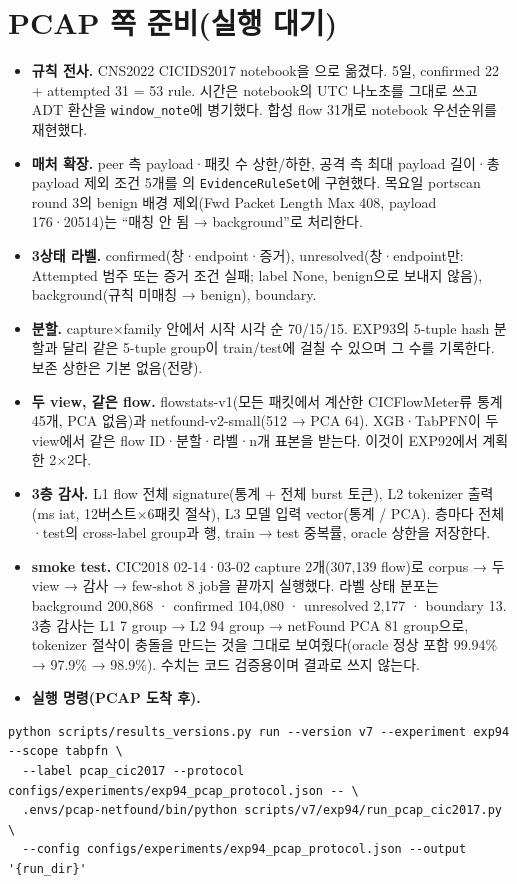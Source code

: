 \section{PCAP 쪽 준비(실행 대기)}
\begin{itemize}
\item \textbf{규칙 전사.} CNS2022 CICIDS2017 notebook을 으로 옮겼다. 5일, confirmed 22 + attempted 31 = 53 rule. 시간은 notebook의 UTC 나노초를 그대로 쓰고 ADT 환산을 \texttt{window\_note}에 병기했다. 합성 flow 31개로 notebook 우선순위를 재현했다.
\item \textbf{매처 확장.} peer 측 payload·패킷 수 상한/하한, 공격 측 최대 payload 길이·총 payload 제외 조건 5개를 의 \texttt{EvidenceRuleSet}에 구현했다. 목요일 portscan round 3의 benign 배경 제외(Fwd Packet Length Max 408, payload 176·20514)는 ``매칭 안 됨 → background''로 처리한다.
\item \textbf{3상태 라벨.} confirmed(창·endpoint·증거), unresolved(창·endpoint만: Attempted 범주 또는 증거 조건 실패; label None, benign으로 보내지 않음), background(규칙 미매칭 → benign), boundary.
\item \textbf{분할.} capture$\times$family 안에서 시작 시각 순 70/15/15. EXP93의 5-tuple hash 분할과 달리 같은 5-tuple group이 train/test에 걸칠 수 있으며 그 수를 기록한다. 보존 상한은 기본 없음(전량).
\item \textbf{두 view, 같은 flow.} flowstats-v1(모든 패킷에서 계산한 CICFlowMeter류 통계 45개, PCA 없음)과 netfound-v2-small(512 → PCA 64). XGB·TabPFN이 두 view에서 같은 flow ID·분할·라벨·n개 표본을 받는다. 이것이 EXP92에서 계획한 2$\times$2다.
\item \textbf{3층 감사.} L1 flow 전체 signature(통계 + 전체 burst 토큰), L2 tokenizer 출력(ms iat, 12버스트$\times$6패킷 절삭), L3 모델 입력 vector(통계 / PCA). 층마다 전체·test의 cross-label group과 행, train$\to$test 중복률, oracle 상한을 저장한다.
\item \textbf{smoke test.} CIC2018 02-14·03-02 capture 2개(307,139 flow)로 corpus → 두 view → 감사 → few-shot 8 job을 끝까지 실행했다. 라벨 상태 분포는 background 200,868 · confirmed 104,080 · unresolved 2,177 · boundary 13. 3층 감사는 L1 7 group → L2 94 group → netFound PCA 81 group으로, tokenizer 절삭이 충돌을 만드는 것을 그대로 보여줬다(oracle 정상 포함 99.94\% → 97.9\% → 98.9\%). 수치는 코드 검증용이며 결과로 쓰지 않는다.
\item \textbf{실행 명령(PCAP 도착 후).}
\end{itemize}
\begin{Verbatim}[fontsize=\small,breaklines=true]
python scripts/results_versions.py run --version v7 --experiment exp94 --scope tabpfn \
  --label pcap_cic2017 --protocol configs/experiments/exp94_pcap_protocol.json -- \
  .envs/pcap-netfound/bin/python scripts/v7/exp94/run_pcap_cic2017.py \
  --config configs/experiments/exp94_pcap_protocol.json --output '{run_dir}'
\end{Verbatim}


